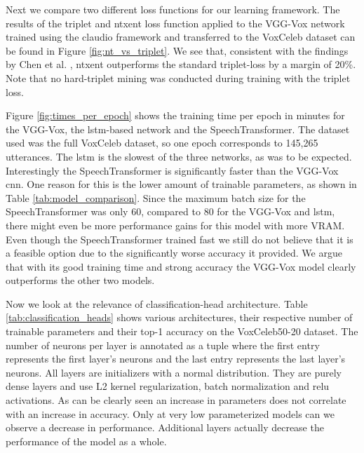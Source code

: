 Next we compare two different loss functions for our learning framework. The results of the triplet and \gls{ntxent} loss function applied to the VGG-Vox network trained using the \gls{claudio} framework and transferred to the VoxCeleb dataset can be found in Figure \ref{fig:nt_vs_triplet}. We see that, consistent with the findings by Chen et al. \cite{chen2020simple}, \gls{ntxent} outperforms the standard triplet-loss by a margin of 20\%. Note that no hard-triplet mining was conducted during training with the triplet loss.

Figure \ref{fig:times_per_epoch} shows the training time per epoch in minutes for the VGG-Vox, the \gls{lstm}-based network and the SpeechTransformer. The dataset used was the full VoxCeleb dataset, so one epoch corresponds to 145,265 utterances. The \gls{lstm} is the slowest of the three networks, as was to be expected.  Interestingly the SpeechTransformer is significantly faster than the VGG-Vox \gls{cnn}. One reason for this is the lower amount of trainable parameters, as shown in Table \ref{tab:model_comparison}. Since the maximum batch size for the SpeechTransformer was only 60, compared to 80 for the VGG-Vox and \gls{lstm}, there might even be more performance gains for this model with more VRAM.  Even though the SpeechTransformer trained fast we still do not believe that it is a feasible option due to the significantly worse accuracy it provided. We argue that with its good training time and strong accuracy the VGG-Vox model clearly outperforms the other two models.

Now we look at the relevance of classification-head architecture. Table \ref{tab:classification_heads} shows various architectures, their respective number of trainable parameters and their top-1 accuracy on the VoxCeleb50-20 dataset. The number of neurons per layer is annotated as a tuple where the first entry represents the first layer’s neurons and the last entry represents the last layer’s neurons. All layers are initializers with a normal distribution. They are purely dense layers and use L2 kernel regularization, batch normalization and \gls{relu} activations. As can be clearly seen an increase in parameters does not correlate with an increase in accuracy. Only at very low parameterized models can we observe a decrease in performance. Additional layers actually decrease the performance of the model as a whole.

